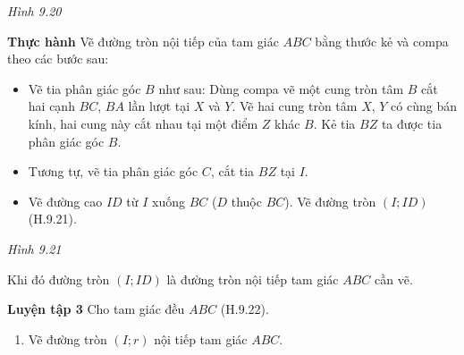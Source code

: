 \begin{lesson}
\begin{center}
    \textit{Hình 9.20}
    \end{center}

    \textbf{Thực hành} Vẽ đường tròn nội tiếp của tam giác $ABC$ bằng thước kẻ và compa theo các bước sau:
    \begin{itemize}
        \item Vẽ tia phân giác góc $B$ như sau: Dùng compa vẽ một cung tròn tâm $B$ cắt hai cạnh $BC$, $BA$ lần lượt tại $X$ và $Y$. Vẽ hai cung tròn tâm $X$, $Y$ có cùng bán kính, hai cung này cắt nhau tại một điểm $Z$ khác $B$. Kẻ tia $BZ$ ta được tia phân giác góc $B$.
        \item Tương tự, vẽ tia phân giác góc $C$, cắt tia $BZ$ tại $I$.
        \item Vẽ đường cao $ID$ từ $I$ xuống $BC$ ($D$ thuộc $BC$). Vẽ đường tròn $(I;ID)$ (H.9.21).
    \end{itemize}

    \begin{center}

    \textit{Hình 9.21}
    \end{center}

    Khi đó đường tròn $(I;ID)$ là đường tròn nội tiếp tam giác $ABC$ cần vẽ.

    \textbf{Luyện tập 3} Cho tam giác đều $ABC$ (H.9.22).
    \begin{enumerate}[label=\alph*)]
        \item Vẽ đường tròn $(I;r)$ nội tiếp tam giác $ABC$.


\end{enumerate}
\end{lesson}
